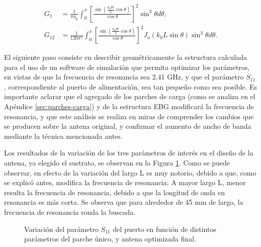 \begin{align}
	\label{eq:conductancia-microstrip-balanis}
	G_1 &= \frac{1}{\pi \eta_0} \int_0^\pi \left[ \frac{\sin \left( \frac{k_0 W}{2} \cos \theta \right) }{\cos \theta}\right]^2 \sin^3 \theta d\theta, \\
	G_{12} &= \frac{1}{120 \pi^2} \int_0^{\pi} \left[ \frac{\sin \left( \frac{k_0 W}{2} \cos \theta \right) }{\cos \theta}\right]^2 J_o(k_0 L \sin \theta) \sin^3 \theta d\theta.
\end{align}

El siguiente paso consiste en describir geométricamente la estructura calculada para el uso de un software de simulación que permita optimizar los parámetros, en vistas de que la frecuencia de resonancia sea 2.41 GHz, y que el parámetro $S_{11}$, correspondiente al puerto de alimentación, sea tan pequeño como sea posible. Es importante aclarar que el agregado de los parches de carga (como se analiza en el Apéndice \ref{sec:parches-carga}) y de la estructura EBG modificará la frecuencia de resonancia, y que este análisis se realiza en miras de comprender los cambios que se producen sobre la antena original, y confirmar el aumento de ancho de banda mediante la técnica mencionada antes.

Los resultados de la variación de los tres parámetros de interés en el diseño de la antena, ya elegido el sustrato, se observan en la Figura \ref{fig:simulaciones-microstrip-1parche}. Como se puede observar, en efecto de la variación del largo L es muy notorio, debido a que, como se explicó antes, modifica la frecuencia de resonancia: A mayor largo L, menor resulta la frecuencia de resonancia, debido a que la longitud de onda en resonancia es más corta. Se observa que para alrededor de 45 mm de largo, la frecuencia de resonancia ronda la buscada.

\begin{figure}[H]
	\centering 
	\hspace{19pt}
	\caption{Variación del parámetro $S_{11}$ del puerto en función de distintos parámetros del parche único, y antena optimizada final.}
	\label{fig:simulaciones-microstrip-1parche}
\end{figure}

